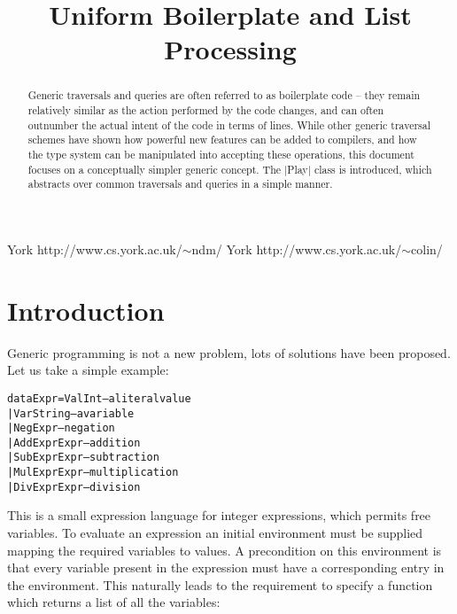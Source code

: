 \documentclass[preprint]{sigplanconf}
\newenvironment{code}{\begin{alltt}\small}{\end{alltt}}
\begin{document}
\copyrightdata{[to be supplied]}

\titlebanner{\today{} - \currenttime{}}        %
\preprintfooter{}   %

\title{Uniform Boilerplate and List Processing}
\subtitle{}

           {York}
           {http://www.cs.york.ac.uk/$\sim$ndm/}
           {York}
           {http://www.cs.york.ac.uk/$\sim$colin/}

\maketitle

\begin{abstract}
Generic traversals and queries are often referred to as boilerplate code -- they remain relatively similar as the action performed by the code changes, and can often outnumber the actual intent of the code in terms of lines. While other generic traversal schemes have shown how powerful new features can be added to compilers, and how the type system can be manipulated into accepting these operations, this document focuses on a conceptually simpler generic concept. The |Play| class is introduced, which abstracts over common traversals and queries in a simple manner.
\end{abstract}

\section{Introduction}

Generic programming is not a new problem, lots of solutions have been proposed. Let us take a simple example:

\begin{code}
data Expr  =  Val  Int         -- a literal value
           |  Var  String      -- a variable
           |  Neg  Expr        -- negation
           |  Add  Expr  Expr  -- addition
           |  Sub  Expr  Expr  -- subtraction
           |  Mul  Expr  Expr  -- multiplication
           |  Div  Expr  Expr  -- division
\end{code}

This is a small expression language for integer expressions, which permits free variables. To evaluate an expression an initial environment must be supplied mapping the required variables to values. A precondition on this environment is that every variable present in the expression must have a corresponding entry in the environment. This naturally leads to the requirement to specify a function which returns a list of all the variables:
\end{document}
